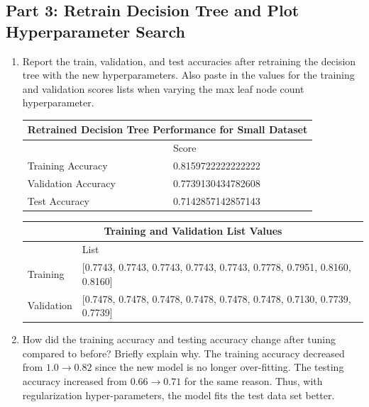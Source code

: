 \subsection{Part 3: Retrain Decision Tree and Plot Hyperparameter Search}
\begin{enumerate}
    \item Report the train, validation, and test accuracies after retraining the decision tree with the new hyperparameters. Also paste in the values for the training and validation scores lists when varying the max leaf node count hyperparameter.
    \begin{center}
        \begin{tabular}{ |p{6cm}||p{3cm}|  }
         \hline
         \multicolumn{2}{|c|}{Retrained Decision Tree Performance for Small Dataset} \\
         \hline
         & Score\\
         \hline
         Training Accuracy   &0.8159722222222222\\
         Validation Accuracy     &0.7739130434782608\\
         Test Accuracy   &0.7142857142857143\\
         \hline
        \end{tabular}
    \end{center}
    \begin{center}
        \begin{tabular}{ |p{2cm}||p{7cm}|  }
         \hline
         \multicolumn{2}{|c|}{Training and Validation List Values} \\
         \hline
         & List\\
         \hline
         Training   &[0.7743, 0.7743, 0.7743, 0.7743, 0.7743, 0.7778, 0.7951, 0.8160, 0.8160]\\
         Validation &[0.7478, 0.7478, 0.7478, 0.7478, 0.7478, 0.7478, 0.7130, 0.7739, 0.7739]\\
         \hline
        \end{tabular}
    \end{center}
    \item  How did the training accuracy and testing accuracy change after tuning compared to before? Briefly explain why.
    \newline
    \newline
    The training accuracy decreased from $1.0 \to 0.82$ since the new model is no longer over-fitting. The testing accuracy increased from $0.66 \to 0.71$ for the same reason. Thus, with regularization hyper-parameters, the model fits the test data set better.
    

\end{enumerate}
